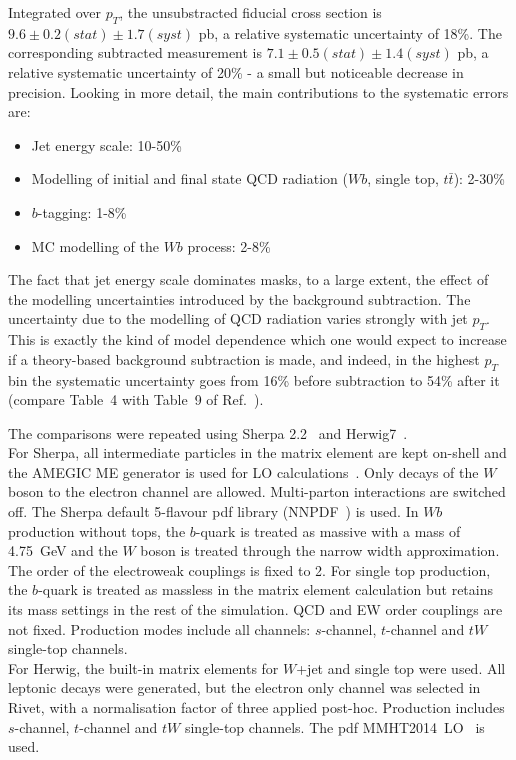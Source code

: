 \documentclass[11pt]{cernrep}
\begin{document}
Integrated over $p_T$, the unsubstracted fiducial cross section is
$9.6 \pm 0.2 (stat) \pm 1.7 (syst)$ pb, a relative systematic uncertainty of 18\%.
The corresponding subtracted measurement is 
$7.1 \pm 0.5 (stat) \pm 1.4 (syst)$ pb, a relative systematic uncertainty of 20\%
- a small but noticeable decrease in precision. Looking in more detail, the main contributions 
to the systematic errors are:
\begin{itemize}
\item Jet energy scale: 10-50\%
\item Modelling of initial and final state QCD radiation ($Wb$, single top, $t\bar{t}$): 2-30\%
\item $b$-tagging: 1-8\%
\item MC modelling of the $Wb$ process: 2-8\%
\end{itemize}

The fact that jet energy scale dominates masks, to a large extent, the effect of the modelling uncertainties introduced by
the background subtraction.
The uncertainty due to the modelling of QCD radiation varies strongly with jet $p_T$. 
This is exactly the kind of model dependence which one would expect to increase if a theory-based background
subtraction is made, and indeed, in the highest $p_T$ bin the systematic uncertainty goes from 16\% before subtraction 
to 54\% after it (compare Table~4 with Table~9 of Ref.~\cite{Aad:2013vka}).

The comparisons were repeated using Sherpa 2.2~\cite{Gleisberg:2008ta} and Herwig7~\cite{Bellm:2015jjp}. 
\\
For Sherpa, all intermediate particles in the matrix element are kept on-shell and the AMEGIC 
ME generator is used for LO calculations~\cite{Krauss:2001iv}. Only decays of the $W$ boson to the 
electron channel are allowed. Multi-parton interactions are switched off. 
The Sherpa default 5-flavour pdf library (NNPDF~\cite{Ball:2014uwa}) is used. In $Wb$ production
without tops, the $b$-quark is treated as massive with a mass of
4.75~GeV and the $W$ boson is treated through the narrow width approximation. The order of the electroweak couplings is fixed to 2. 
For single top production, the $b$-quark is treated as massless in the matrix element calculation
but retains its mass settings in the rest of the simulation. QCD and EW order couplings are not
fixed. Production modes include all channels: $s$-channel, $t$-channel and $tW$ single-top channels.
\\
For Herwig, the built-in matrix elements for $W$+jet and single top were used. All leptonic decays
were generated, but the electron only channel was selected in Rivet, with a normalisation factor
of three applied post-hoc. Production includes $s$-channel,
$t$-channel and $tW$ single-top channels. The pdf MMHT2014~LO~\cite{Harland-Lang:2014zoa} is used. 
\end{document}
